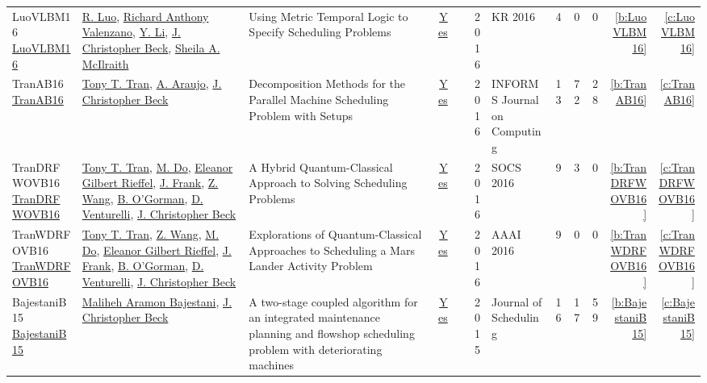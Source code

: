 {\begin{longtable}{>{\raggedright\arraybackslash}p{3cm}>{\raggedright\arraybackslash}p{6cm}>{\raggedright\arraybackslash}p{6.5cm}rrrp{2.5cm}rrrrr}
LuoVLBM16 \href{http://www.aaai.org/ocs/index.php/KR/KR16/paper/view/12909}{LuoVLBM16} & \hyperref[auth:a825]{R. Luo}, \hyperref[auth:a826]{Richard Anthony Valenzano}, \hyperref[auth:a827]{Y. Li}, \hyperref[auth:a89]{J. Christopher Beck}, \hyperref[auth:a828]{Sheila A. McIlraith} & Using Metric Temporal Logic to Specify Scheduling Problems & \href{../works/LuoVLBM16.pdf}{Yes} & \cite{LuoVLBM16} & 2016 & KR 2016 & 4 & 0 & 0 & \ref{b:LuoVLBM16} & \ref{c:LuoVLBM16}\\
TranAB16 \href{https://doi.org/10.1287/ijoc.2015.0666}{TranAB16} & \hyperref[auth:a811]{Tony T. Tran}, \hyperref[auth:a819]{A. Araujo}, \hyperref[auth:a89]{J. Christopher Beck} & Decomposition Methods for the Parallel Machine Scheduling Problem with Setups & \href{../works/TranAB16.pdf}{Yes} & \cite{TranAB16} & 2016 & INFORMS Journal on Computing & 13 & 72 & 28 & \ref{b:TranAB16} & \ref{c:TranAB16}\\
TranDRFWOVB16 \href{https://doi.org/10.1609/socs.v7i1.18390}{TranDRFWOVB16} & \hyperref[auth:a811]{Tony T. Tran}, \hyperref[auth:a821]{M. Do}, \hyperref[auth:a822]{Eleanor Gilbert Rieffel}, \hyperref[auth:a385]{J. Frank}, \hyperref[auth:a820]{Z. Wang}, \hyperref[auth:a823]{B. O'Gorman}, \hyperref[auth:a824]{D. Venturelli}, \hyperref[auth:a89]{J. Christopher Beck} & A Hybrid Quantum-Classical Approach to Solving Scheduling Problems & \href{../works/TranDRFWOVB16.pdf}{Yes} & \cite{TranDRFWOVB16} & 2016 & SOCS 2016 & 9 & 3 & 0 & \ref{b:TranDRFWOVB16} & \ref{c:TranDRFWOVB16}\\
TranWDRFOVB16 \href{http://www.aaai.org/ocs/index.php/WS/AAAIW16/paper/view/12664}{TranWDRFOVB16} & \hyperref[auth:a811]{Tony T. Tran}, \hyperref[auth:a820]{Z. Wang}, \hyperref[auth:a821]{M. Do}, \hyperref[auth:a822]{Eleanor Gilbert Rieffel}, \hyperref[auth:a385]{J. Frank}, \hyperref[auth:a823]{B. O'Gorman}, \hyperref[auth:a824]{D. Venturelli}, \hyperref[auth:a89]{J. Christopher Beck} & Explorations of Quantum-Classical Approaches to Scheduling a Mars Lander Activity Problem & \href{../works/TranWDRFOVB16.pdf}{Yes} & \cite{TranWDRFOVB16} & 2016 & AAAI 2016 & 9 & 0 & 0 & \ref{b:TranWDRFOVB16} & \ref{c:TranWDRFOVB16}\\
BajestaniB15 \href{https://doi.org/10.1007/s10951-015-0416-2}{BajestaniB15} & \hyperref[auth:a829]{Maliheh Aramon Bajestani}, \hyperref[auth:a89]{J. Christopher Beck} & A two-stage coupled algorithm for an integrated maintenance planning and flowshop scheduling problem with deteriorating machines & \href{../works/BajestaniB15.pdf}{Yes} & \cite{BajestaniB15} & 2015 & Journal of Scheduling & 16 & 17 & 59 & \ref{b:BajestaniB15} & \ref{c:BajestaniB15}\\

\end{longtable}}
